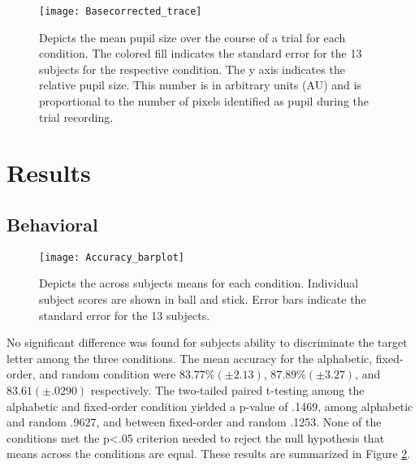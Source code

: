 \documentclass[10pt]{article}
\begin{document}




\begin{figure}[t]
  \centering
  \texttt{[image: Basecorrected\_trace]}
  \caption{Depicts the mean pupil size over the course of a trial
  for each condition.  The colored fill indicates the standard error
  for the 13 subjects for the respective condition.  The y axis indicates the
  relative pupil size.  This number is in arbitrary units (AU) and
  is proportional to the number of pixels identified as pupil during
  the trial recording.}
  \label{trialtrace}
\end{figure}

\section{Results}

\subsection{Behavioral}

\begin{figure}[t]
  \centering
  \texttt{[image: Accuracy\_barplot]}
  \caption{Depicts the across subjects means for each
  condition.  Individual subject scores are shown in ball and stick.  Error bars
  indicate the standard error for the 13 subjects.}
  \label{accuracy}
\end{figure}

No significant difference was found for subjects ability to
discriminate the target letter among the three conditions.
The mean accuracy for the alphabetic, fixed-order, and random
condition were $83.77 \% (\pm2.13)$, $87.89 \% (\pm3.27)$,
and $83.61 (\pm .0290)$ respectively.  The two-tailed paired t-testing among 
the alphabetic and fixed-order condition yielded a p-value of .1469,
among alphabetic and random .9627, and between fixed-order and
random .1253.  None of the conditions met the p<.05 criterion needed
to reject the null hypothesis that means across the conditions are
equal. These results are summarized in Figure \ref{accuracy}.
\end{document}
